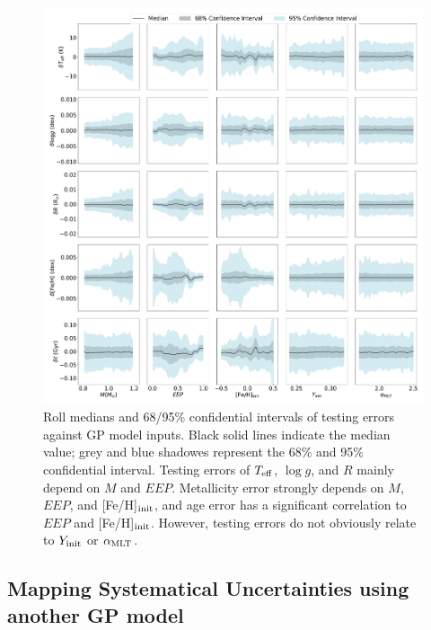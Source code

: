 \begin{figure}
	\includegraphics[width=2.0\columnwidth]{ 5d-testing_vs_inputs.pdf}
    \caption{ Roll medians and 68/95\% confidential intervals of testing errors against GP model  inputs. Black solid lines indicate the median value; grey and blue shadowes represent the 68\% and 95\% confidential interval. Testing errors of $T_{\rm eff}$, $\log g$, and $R$ mainly depend on $M$ and $EEP$. Metallicity error strongly depends on $M$, $EEP$, and [Fe/H]$_{\rm init}$, and age error has a significant correlation to $EEP$ and [Fe/H]$_{\rm init}$. However, testing errors do not obviously relate to $Y_{\rm init}$ or $\alpha_{\rm MLT}$. } 
  \label{fig:5d_test_vs_input}
\end{figure}
%

\subsection{Mapping Systematical Uncertainties using another GP model}\label{sec:sys}

